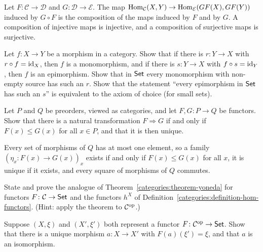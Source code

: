 \begin{solution}
Let $F \colon \mathcal{C} \to \mathcal{D}$ and $G \colon \mathcal{D} \to \mathcal{E}$.
The map $\operatorname{Hom}_{\mathcal{C}}(X, Y) \to \operatorname{Hom}_{\mathcal{E}}(GF(X), GF(Y))$ induced
by $G \circ F$ is the composition of the maps induced by $F$ and by $G$. A
composition of injective maps is injective, and a composition of surjective
maps is surjective.
\end{solution}

\begin{exercise}\label{categories:exercise-sections-retractions}
Let $f \colon X \to Y$ be a morphism in a category. Show that if there is
$r \colon Y \to X$ with $r \circ f = \mathrm{id}_X$, then $f$ is a monomorphism, and if
there is $s \colon Y \to X$ with $f \circ s = \mathrm{id}_Y$, then $f$ is an
epimorphism. Show that in $\mathsf{Set}$ every monomorphism with non-empty source has
such an $r$. Show that the statement ``every epimorphism in $\mathsf{Set}$ has such an
$s$'' is equivalent to the axiom of choice (for small sets).
\end{exercise}

\begin{exercise}\label{categories:exercise-preorder-natural}
Let $P$ and $Q$ be preorders, viewed as categories, and let
$F, G \colon P \to Q$ be functors. Show that there is a natural transformation
$F \Rightarrow G$ if and only if $F(x) \leq G(x)$ for all $x \in P$, and that
it is then unique.
\end{exercise}

\begin{solution}
Every set of morphisms of $Q$ has at most one element, so a family
$(\eta_x \colon F(x) \to G(x))_x$ exists if and only if $F(x) \leq G(x)$ for
all $x$, it is unique if it exists, and every square of morphisms of $Q$
commutes.
\end{solution}

\begin{exercise}\label{categories:exercise-covariant-yoneda}
State and prove the analogue of Theorem~\ref{categories:theorem-yoneda} for
functors $F \colon \mathcal{C} \to \mathsf{Set}$ and the functors $h^X$ of
Definition~\ref{categories:definition-hom-functors}. (Hint: apply the theorem
to $\mathcal{C}^{\mathrm{op}}$.)
\end{exercise}

\begin{exercise}\label{categories:exercise-representing-unique}
Suppose $(X, \xi)$ and $(X', \xi')$ both represent a functor
$F \colon \mathcal{C}^{\mathrm{op}} \to \mathsf{Set}$. Show that there is a unique morphism
$a \colon X \to X'$ with $F(a)(\xi') = \xi$, and that $a$ is an isomorphism.
\end{exercise}

